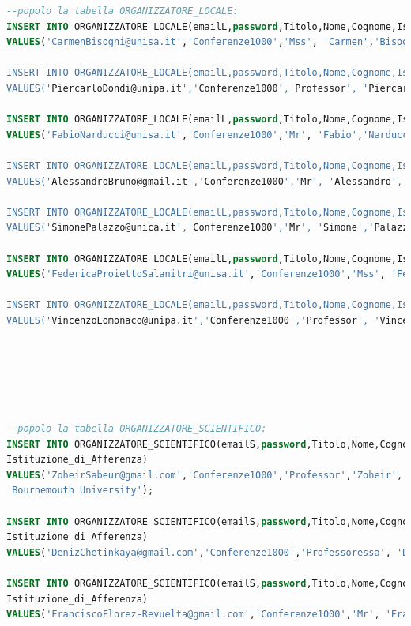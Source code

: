 \documentclass[a4page]{article}
\begin{document}
\begin{lstlisting}[language=SQL,
        deletekeywords={IDENTITY,INT},
        morekeywords={clustered},    
        framesep=10pt,
        framextopmargin=10pt]
--popolo la tabella ORGANIZZATORE_LOCALE:
INSERT INTO ORGANIZZATORE_LOCALE(emailL,password,Titolo,Nome,Cognome,Istituzione_di_Afferenza)
VALUES('CarmenBisogni@unisa.it','Conferenze1000','Mss', 'Carmen','Bisogni', 'Universita' degli Studi di Salerno');

INSERT INTO ORGANIZZATORE_LOCALE(emailL,password,Titolo,Nome,Cognome,Istituzione_di_Afferenza)
VALUES('PiercarloDondi@unipa.it','Conferenze1000','Professor', 'Piercarlo','Dondi', 'Universita' di Pavia');

INSERT INTO ORGANIZZATORE_LOCALE(emailL,password,Titolo,Nome,Cognome,Istituzione_di_Afferenza)
VALUES('FabioNarducci@unisa.it','Conferenze1000','Mr', 'Fabio','Narducci', 'Universita' degli Studi di Salerno');

INSERT INTO ORGANIZZATORE_LOCALE(emailL,password,Titolo,Nome,Cognome,Istituzione_di_Afferenza)
VALUES('AlessandroBruno@gmail.it','Conferenze1000','Mr', 'Alessandro','Bruno', 'Humanitas University');

INSERT INTO ORGANIZZATORE_LOCALE(emailL,password,Titolo,Nome,Cognome,Istituzione_di_Afferenza)
VALUES('SimonePalazzo@unica.it','Conferenze1000','Mr', 'Simone','Palazzo', 'Universita' di Catania');

INSERT INTO ORGANIZZATORE_LOCALE(emailL,password,Titolo,Nome,Cognome,Istituzione_di_Afferenza)
VALUES('FedericaProiettoSalanitri@unisa.it','Conferenze1000','Mss', 'Federica','Proietto Salanitri', 'Universita' di Catania');

INSERT INTO ORGANIZZATORE_LOCALE(emailL,password,Titolo,Nome,Cognome,Istituzione_di_Afferenza)
VALUES('VincenzoLomonaco@unipa.it','Conferenze1000','Professor', 'Vincenzo','Lomonaco', 'Universita' di Pavia');






--popolo la tabella ORGANIZZATORE_SCIENTIFICO:
INSERT INTO ORGANIZZATORE_SCIENTIFICO(emailS,password,Titolo,Nome,Cognome,
Istituzione_di_Afferenza)
VALUES('ZoheirSabeur@gmail.com','Conferenze1000','Professor','Zoheir','Sabeur',
'Bournemouth University');

INSERT INTO ORGANIZZATORE_SCIENTIFICO(emailS,password,Titolo,Nome,Cognome,
Istituzione_di_Afferenza)
VALUES('DenizChetinkaya@gmail.com','Conferenze1000','Professoressa', 'Deniz','Chetinkaya', 'Bournemouth University');

INSERT INTO ORGANIZZATORE_SCIENTIFICO(emailS,password,Titolo,Nome,Cognome,
Istituzione_di_Afferenza)
VALUES('FranciscoFlorez-Revuelta@gmail.com','Conferenze1000','Mr', 'Francisco','Florez-Revuelta', 'University of Alicante');


\end{lstlisting}
\end{document}
